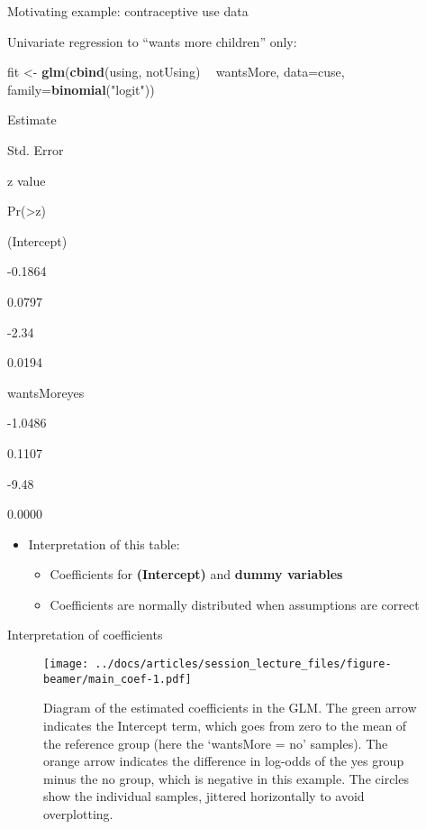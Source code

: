 \documentclass[
  ignorenonframetext,
]{beamer}
\newenvironment{Shaded}{\begin{snugshade}}{\end{snugshade}}
\newcommand{\DataTypeTok}[1]{\textcolor[rgb]{0.13,0.29,0.53}{#1}}
\newcommand{\KeywordTok}[1]{\textcolor[rgb]{0.13,0.29,0.53}{\textbf{#1}}}
\newcommand{\NormalTok}[1]{#1}
\newcommand{\OperatorTok}[1]{\textcolor[rgb]{0.81,0.36,0.00}{\textbf{#1}}}
\newcommand{\StringTok}[1]{\textcolor[rgb]{0.31,0.60,0.02}{#1}}
\providecommand{\tightlist}{%
  \setlength{\itemsep}{0pt}\setlength{\parskip}{0pt}}
\begin{document}
\begin{frame}[fragile]{Motivating example: contraceptive use data}
\protect\hypertarget{motivating-example-contraceptive-use-data-1}{}

Univariate regression to ``wants more children'' only:

\tiny

\begin{Shaded}
\begin{Highlighting}[]
\NormalTok{fit <-}\StringTok{ }\KeywordTok{glm}\NormalTok{(}\KeywordTok{cbind}\NormalTok{(using, notUsing) }\OperatorTok{~}\StringTok{ }\NormalTok{wantsMore, }
           \DataTypeTok{data=}\NormalTok{cuse, }\DataTypeTok{family=}\KeywordTok{binomial}\NormalTok{(}\StringTok{"logit"}\NormalTok{))}
\end{Highlighting}
\end{Shaded}

Estimate

Std. Error

z value

Pr(\textgreater\textbar z\textbar)

(Intercept)

-0.1864

0.0797

-2.34

0.0194

wantsMoreyes

-1.0486

0.1107

-9.48

0.0000

\begin{itemize}
\tightlist
\item
  Interpretation of this table:

  \begin{itemize}
  \tightlist
  \item
    Coefficients for \textbf{(Intercept)} and \textbf{dummy variables}
  \item
    Coefficients are normally distributed when assumptions are correct
  \end{itemize}
\end{itemize}

\end{frame}

\begin{frame}{Interpretation of coefficients}
\protect\hypertarget{interpretation-of-coefficients}{}

\begin{figure}
\centering
\texttt{[image: ../docs/articles/session\_lecture\_files/figure-beamer/main\_coef-1.pdf]}
\caption{Diagram of the estimated coefficients in the GLM. The green
arrow indicates the Intercept term, which goes from zero to the mean of
the reference group (here the `wantsMore = no' samples). The orange
arrow indicates the difference in log-odds of the yes group minus the no
group, which is negative in this example. The circles show the
individual samples, jittered horizontally to avoid overplotting.}
\end{figure}

\end{frame}
\end{document}
